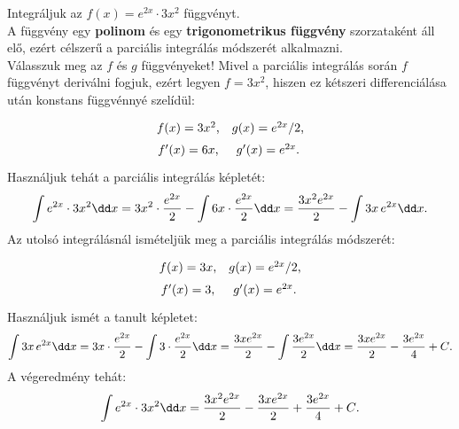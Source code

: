\begin{example}
  Integráljuk az $f(x) = e^{2x} \cdot 3x^2$ függvényt.
  \\[3mm]
  A függvény egy \textbf{polinom} és egy \textbf{trigonometrikus függvény}
  szorzataként áll elő, ezért célszerű a parciális integrálás módszerét
  alkalmazni.
  \\[3mm]
  Válasszuk meg az $f$ és $g$ függvényeket! Mivel a parciális integrálás során
  $f$ függvényt deriválni fogjuk, ezért legyen $f = 3x^2$, hiszen ez kétszeri
  differenciálása után konstans függvénnyé szelídül:
  \[
    \def\arraystretch{1.5}
    \begin{array}{cc}
      f(x) = 3x^2 \text, &
      g(x) = e^{2x} / 2 \text, \\
      f'(x) = 6x \text,  &
      g'(x) = e^{2x} \text.
    \end{array}
  \]
  Használjuk tehát a parciális integrálás képletét:
  \[
    \int e^{2x} \cdot 3x^2 \dd x
    = 3x^2 \cdot \frac{e^{2x}}{2}
    - \int 6x \cdot  \frac{e^{2x}}{2} \dd x
    = \frac{3 x^2 e^{2x}}{2}
    - \int 3x \, e^{2x} \dd x
    \text.
  \]
  Az utolsó integrálásnál ismételjük meg a parciális integrálás módszerét:
  \[
    \def\arraystretch{1.5}
    \begin{array}{cc}
      f(x) = 3x \text, &
      g(x) = e^{2x} / 2 \text, \\
      f'(x) = 3 \text, &
      g'(x) = e^{2x} \text.    \\
    \end{array}
  \]
  Használjuk ismét a tanult képletet:
  \[
    \int 3x \, e^{2x} \dd x
    = 3x \cdot \frac{e^{2x}}{2}
    - \int 3 \cdot  \frac{e^{2x}}{2} \dd x
    = \frac{3 x e^{2x}}{2}
    - \int \frac{3 e^{2x}}{2} \dd x
    = \frac{3 x e^{2x}}{2}
    - \frac{3 e^{2x}}{4}
    + C
    \text.
  \]
  A végeredmény tehát:
  \[
    \int e^{2x} \cdot 3x^2 \dd x
    = \frac{3 x^2 e^{2x}}{2}
    - \frac{3 x e^{2x}}{2}
    + \frac{3 e^{2x}}{4}
    + C
    \text.
  \]
\end{example}

